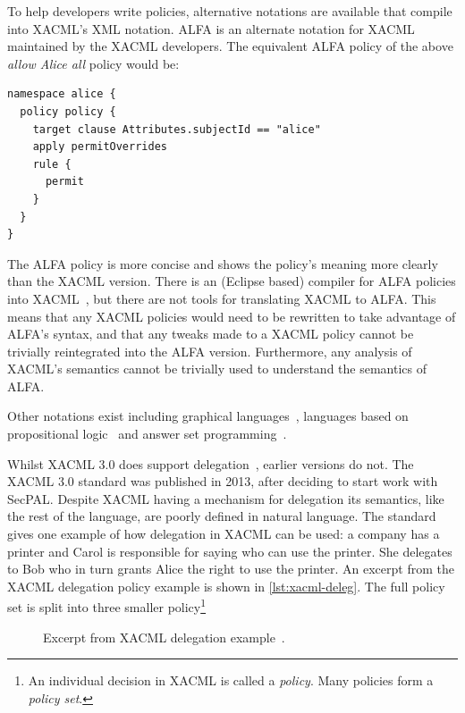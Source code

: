 \documentclass[thesis.tex]{subfiles}
\begin{document}
To help developers write policies, alternative notations are available that
compile into XACML's XML notation. ALFA is an alternate notation for
XACML~\cite{oasis_xacml_technical_comitee_abbreviated_2015} maintained by the
XACML developers. The equivalent ALFA policy of the above \emph{allow Alice all}
policy would be:

\noindent\begin{minipage}{\linewidth}
\begin{lstlisting}
namespace alice {
  policy policy {
    target clause Attributes.subjectId == "alice"
    apply permitOverrides
    rule {
      permit
    }
  }
}
\end{lstlisting}
\end{minipage}

The ALFA policy is more concise and shows the
policy's meaning more clearly than the XACML version.
There is an (Eclipse based) compiler for ALFA policies into
XACML~\cite{axiomaics_axiomatics_2012}, but there are not tools for
translating XACML to ALFA.  This means that any XACML policies would
need to be rewritten to take advantage of ALFA's syntax, and that any
tweaks made to a XACML policy cannot be trivially reintegrated into
the ALFA version.  Furthermore, any analysis of XACML's semantics cannot
be trivially used to understand the semantics of ALFA.

Other notations exist including graphical
languages~\cite{henrik_nergaard_scratch-based_2015}, languages based on
propositional logic~\cite{zhang_synthesising_2004} and answer set
programming~\cite{ramli_xacml_2012}.

Whilst XACML 3.0 does support delegation~\cite{oasis_xacml_2010}, earlier
versions do not. The XACML 3.0 standard was published in 2013, after deciding to
start work with SecPAL. Despite XACML having a mechanism for delegation its
semantics, like the rest of the language, are poorly defined in natural
language. The standard gives one example of how delegation in XACML can be used:
a company has a printer and Carol is responsible for saying who can use the
printer. She delegates to Bob who in turn grants Alice the right to use the
printer. An excerpt from the XACML delegation policy example is shown in
\autoref{lst:xacml-deleg}. The full policy set is split into three smaller
policy\footnote{An individual decision in XACML is called a \emph{policy}. Many policies form a \emph{policy set}.}

\begin{figure}
  \begin{minipage}{1\textwidth}
      
  \end{minipage}
  \caption[Excerpt from XACML delegation example.]{Excerpt from XACML delegation example~\cite{oasis_xacml_2010}.}
  \label{lst:xacml-deleg}
\end{figure}
\end{document}
